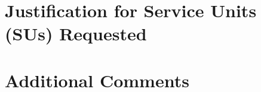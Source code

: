 \documentclass{proposalnsf}
\begin{document}
\section*{Justification for Service Units (SUs) Requested}

\section*{Additional Comments}





\newpage
{}
\renewcommand{\thepage} {E--\arabic{page}}




\newpage
{}
\renewcommand{\thepage} {G--\arabic{page}}
\end{document}
